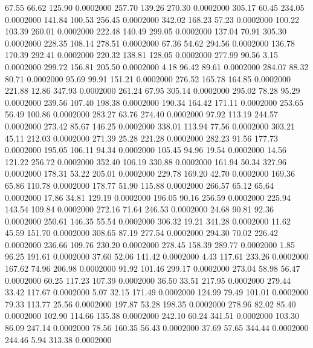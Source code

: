   67.55   66.62  125.90   0.0002000
 257.70  139.26  270.30   0.0002000
 305.17   60.45  234.05   0.0002000
 141.84  100.53  256.45   0.0002000
 342.02  168.23   57.23   0.0002000
 100.22  103.39  260.01   0.0002000
 222.48  140.49  299.05   0.0002000
 137.04   70.91  305.30   0.0002000
 228.35  108.14  278.51   0.0002000
  67.36   54.62  294.56   0.0002000
 136.78  170.39  292.41   0.0002000
 220.32  138.81  128.05   0.0002000
 277.99   90.56    3.15   0.0002000
 299.72  156.81  205.50   0.0002000
   4.18   96.42   89.61   0.0002000
 284.07   88.32   80.71   0.0002000
  95.69   99.91  151.21   0.0002000
 276.52  165.78  164.85   0.0002000
 221.88   12.86  347.93   0.0002000
 261.24   67.95  305.14   0.0002000
 295.02   78.28   95.29   0.0002000
 239.56  107.40  198.38   0.0002000
 190.34  164.42  171.11   0.0002000
 253.65   56.49  100.86   0.0002000
 283.27   63.76  274.40   0.0002000
  97.92  113.19  244.57   0.0002000
 273.42   85.67  146.25   0.0002000
 338.01  113.94   77.56   0.0002000
 303.21   45.11  212.03   0.0002000
 271.39   25.28  221.28   0.0002000
 282.23   91.56  177.73   0.0002000
 195.05  106.11   94.34   0.0002000
 105.45   94.96   19.54   0.0002000
  14.56  121.22  256.72   0.0002000
 352.40  106.19  330.88   0.0002000
 161.94   50.34  327.96   0.0002000
 178.31   53.22  205.01   0.0002000
 229.78  169.20   42.70   0.0002000
 169.36   65.86  110.78   0.0002000
 178.77   51.90  115.88   0.0002000
 266.57   65.12   65.64   0.0002000
  17.86   34.81  129.19   0.0002000
 196.05   90.16  256.59   0.0002000
 225.94  143.54  109.84   0.0002000
 272.16   71.64  246.53   0.0002000
  24.68   90.81   92.36   0.0002000
 250.61  146.35   55.54   0.0002000
 306.32   19.21  341.28   0.0002000
  11.62   45.59  151.70   0.0002000
 308.65   87.19  277.54   0.0002000
 294.30   70.02  226.42   0.0002000
 236.66  109.76  230.20   0.0002000
 278.45  158.39  289.77   0.0002000
   1.85   96.25  191.61   0.0002000
  37.60   52.06  141.42   0.0002000
   4.43  117.61  233.26   0.0002000
 167.62   74.96  206.98   0.0002000
  91.92  101.46  299.17   0.0002000
 273.04   58.98   56.47   0.0002000
  60.25  117.23  107.39   0.0002000
  36.50   33.51  217.95   0.0002000
 279.44   33.42  117.67   0.0002000
   5.07   32.15  171.49   0.0002000
 124.99   79.49  101.01   0.0002000
  79.33  113.77   25.56   0.0002000
 197.87   53.28  198.35   0.0002000
 278.96   82.02   85.40   0.0002000
 102.90  114.66  135.38   0.0002000
 242.10   60.24  341.51   0.0002000
 103.30   86.09  247.14   0.0002000
  78.56  160.35   56.43   0.0002000
  37.69   57.65  344.44   0.0002000
 244.46    5.94  313.38   0.0002000
